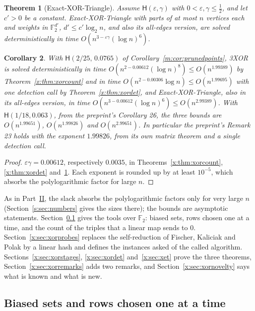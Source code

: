 \documentclass[11pt]{article}
\newtheorem{theorem}{Theorem}[section]
\newtheorem{corollary}[theorem]{Corollary}
\theoremstyle{definition}
\theoremstyle{remark}
\newcommand{\F}{\mathbb{F}_2}
\newcommand{\Hyp}{\mathsf{H}}
\newcommand{\EpsGammaBest}{0.00612}%
\newcommand{\HypPrunedEps}{2/25}%
\newcommand{\HypPrunedGamma}{0.0765}%
\newcommand{\EpsGammaBestHalf}{0.00306}%
\newcommand{\ExpBestUp}{1.99389}%
\newcommand{\ExpTriBestUp}{2.99389}%
\newcommand{\ExpHalfBestUp}{1.99695}%
\begin{document}
\begin{theorem}[Exact-XOR-Triangle]\label{x:thm:xet}
Assume $\Hyp(\varepsilon,\gamma)$ with $0<\varepsilon,\gamma\le\frac12$, and let $c'>0$ be a constant. Exact-XOR-Triangle with parts of at most $n$ vertices each and weights in $\F^{d'}$, $d'\le c'\log_2n$, and also its all-edges version, are solved deterministically in time $O(n^{3-\varepsilon\gamma}(\log n)^6)$.
\end{theorem}

\begin{corollary}\label{x:cor:xor}
With $\Hyp(\HypPrunedEps,\,\HypPrunedGamma)$ of Corollary~\ref{m:cor:prunedpoints}, 3XOR is solved deterministically in time $O(n^{2-\EpsGammaBest}(\log n)^8)\le O(n^{\ExpBestUp})$ by Theorem~\ref{x:thm:xorcount} and in time $O(n^{2-\EpsGammaBestHalf}\log n)\le O(n^{\ExpHalfBestUp})$ with one detection call by Theorem~\ref{x:thm:xordet}, and Exact-XOR-Triangle, also in its all-edges version, in time $O(n^{3-\EpsGammaBest}(\log n)^6)\le O(n^{\ExpTriBestUp})$. With $\Hyp(1/18,0.063)$, from the preprint's Corollary 26, the three bounds are $O(n^{1.99651})$, $O(n^{1.99826})$ and $O(n^{2.99651})$. In particular the preprint's Remark 23 holds with the exponent $1.99826$, from its own matrix theorem and a single detection call.
\end{corollary}

\begin{proof}
$\varepsilon\gamma=\EpsGammaBest$, respectively $0.0035$, in Theorems~\ref{x:thm:xorcount}, \ref{x:thm:xordet} and~\ref{x:thm:xet}. Each exponent is rounded up by at least $10^{-5}$, which absorbs the polylogarithmic factor for large $n$.
\end{proof}

As in Part~\hyperref[m:partII]{II}, the slack absorbs the polylogarithmic factors only for very large $n$ (Section~\ref{s:sec:numbers} gives the sizes there); the bounds are asymptotic statements. Section~\ref{x:sec:xorbias} gives the tools over $\F$: biased sets, rows chosen one at a time, and the count of the triples that a linear map sends to $0$. Section~\ref{x:sec:xorprobes} replaces the self-reduction of Fischer, Kaliciak and Polak by a linear hash and defines the instances asked of the called algorithm. Sections~\ref{x:sec:xorstages}, \ref{x:sec:xordet} and~\ref{x:sec:xet} prove the three theorems, Section~\ref{x:sec:xorremarks} adds two remarks, and Section~\ref{x:sec:xornovelty} says what is known and what is new.

\subsection{Biased sets and rows chosen one at a time}\label{x:sec:xorbias}
\end{document}
